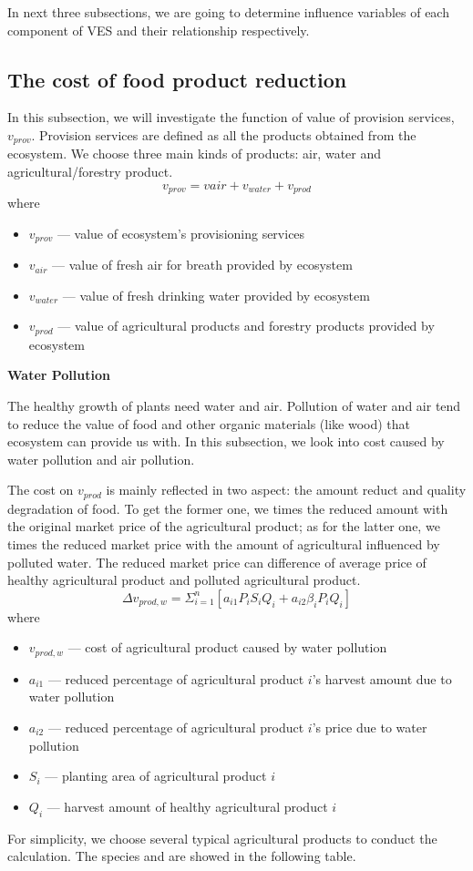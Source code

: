 \documentclass{mcmthesis}
\begin{document}
In next three subsections, we are going to determine influence variables of each component of VES and their relationship respectively.

\subsection{The cost of food product reduction}
In this subsection, we will investigate the function of value of provision services, $v_{prov}$. Provision services are defined as all the products obtained from the ecosystem. We choose three main kinds of products: air, water and agricultural/forestry product. 
\begin{equation}
v_{prov}=v{air}+v_{water}+v_{prod}
\end{equation}
where \begin{itemize}
\item $v_{prov}$ --- value of ecosystem's provisioning services
\item $v_{air}$ --- value of fresh air for breath provided by ecosystem
\item $v_{water}$ --- value of fresh drinking water provided by ecosystem
\item $v_{prod}$ --- value of agricultural products and forestry products provided by ecosystem
\end{itemize}

\noindent\textbf{Water Pollution}

The healthy growth of plants need water and air. Pollution of water and air tend to reduce the value of food and other organic materials (like wood) that ecosystem can provide us with. In this subsection, we look into cost caused by water pollution and air pollution.

The cost on $v_{prod}$ is mainly reflected in two aspect: the amount reduct and quality degradation of food. To get the former one, we times the reduced amount with the original market price of the agricultural product; as for the latter one, we times the reduced market price with the amount of agricultural influenced by polluted water. The reduced market price can difference of average price of healthy agricultural product and polluted agricultural product.
\begin{equation}
\Delta v_{prod,w}=\Sigma_{i=1}^{n}[a_{i1}P_iS_iQ_i+a_{i2}\beta_iP_iQ_i]
\end{equation}
where\begin{itemize}
\item $v_{prod,w}$ --- cost of agricultural product caused by water pollution
\item $a_{i1}$ --- reduced percentage of agricultural product $i$'s harvest amount due to water pollution
\item $a_{i2}$ --- reduced percentage of agricultural product $i$'s price due to water pollution
\item $S_i$ --- planting area of agricultural product $i$
\item $Q_i$ --- harvest amount of healthy agricultural product $i$
\end{itemize}
For simplicity, we choose several typical agricultural products to conduct the calculation. The species and  are showed in the following table.
\end{document}

